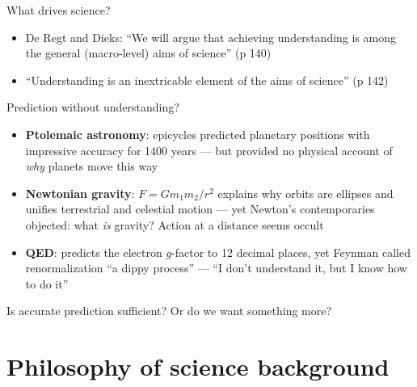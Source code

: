 \documentclass[fleqn]{beamer}
\begin{document}
\begin{frame}{What drives science?}

  \begin{itemize}
  \item De Regt and Dieks: ``We will argue that achieving
    understanding is among the general (macro-level) aims of science''
    (p 140)
  \item ``Understanding is an inextricable element of the aims of
    science'' (p 142)
  \end{itemize}

\end{frame}

\begin{frame}{Prediction without understanding?}

  \begin{itemize}
  \item \textbf{Ptolemaic astronomy}: epicycles predicted planetary
    positions with impressive accuracy for 1400 years --- but provided
    no physical account of \emph{why} planets move this way
  \item \textbf{Newtonian gravity}: $F = Gm_1m_2/r^2$ explains why
    orbits are ellipses and unifies terrestrial and celestial motion
    --- yet Newton's contemporaries objected: what \emph{is} gravity?
    Action at a distance seems occult
  \item \textbf{QED}: predicts the electron $g$-factor to 12 decimal
    places, yet Feynman called renormalization ``a dippy process'' ---
    ``I don't understand it, but I know how to do it''
  \end{itemize}

  \vspace{0.5em}
  \small Is accurate prediction sufficient? Or do we want something
  more?

\end{frame}

\section{Philosophy of science background}
\end{document}
